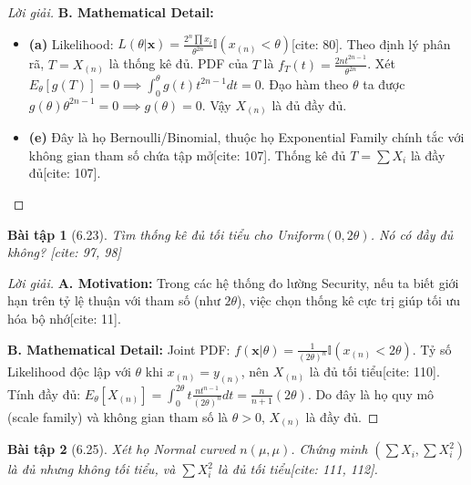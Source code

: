 \documentclass[8pt,a4paper]{article}
\newtheorem{exercise}{Bài tập}
\newenvironment{solution}{\begin{proof}[Lời giải]}{\end{proof}}
\begin{document}
\begin{solution}
\textbf{B. Mathematical Detail:}
\begin{itemize}
    \item \textbf{(a)} Likelihood: $L(\theta|\mathbf{x}) = \frac{2^n \prod x_i}{\theta^{2n}} \mathbb{I}(x_{(n)} < \theta)$[cite: 80]. Theo định lý phân rã, $T = X_{(n)}$ là thống kê đủ. PDF của $T$ là $f_T(t) = \frac{2nt^{2n-1}}{\theta^{2n}}$. Xét $E_\theta[g(T)]=0 \implies \int_0^\theta g(t)t^{2n-1} dt = 0$. Đạo hàm theo $\theta$ ta được $g(\theta)\theta^{2n-1} = 0 \implies g(\theta)=0$. Vậy $X_{(n)}$ là đủ đầy đủ.
    \item \textbf{(e)} Đây là họ Bernoulli/Binomial, thuộc họ Exponential Family chính tắc với không gian tham số chứa tập mở[cite: 107]. Thống kê đủ $T = \sum X_i$ là đầy đủ[cite: 107].
\end{itemize}
\end{solution}

\begin{exercise}[6.23]
Tìm thống kê đủ tối tiểu cho Uniform$(0, 2\theta)$. Nó có đầy đủ không? [cite: 97, 98]
\end{exercise}

\begin{solution}
\textbf{A. Motivation:} Trong các hệ thống đo lường Security, nếu ta biết giới hạn trên tỷ lệ thuận với tham số (như $2\theta$), việc chọn thống kê cực trị giúp tối ưu hóa bộ nhớ[cite: 11].

\textbf{B. Mathematical Detail:}
Joint PDF: $f(\mathbf{x}|\theta) = \frac{1}{(2\theta)^n} \mathbb{I}(x_{(n)} < 2\theta)$. Tỷ số Likelihood độc lập với $\theta$ khi $x_{(n)} = y_{(n)}$, nên $X_{(n)}$ là đủ tối tiểu[cite: 110]. 
Tính đầy đủ: $E_\theta[X_{(n)}] = \int_0^{2\theta} t \frac{nt^{n-1}}{(2\theta)^n} dt = \frac{n}{n+1}(2\theta)$. Do đây là họ quy mô (scale family) và không gian tham số là $\theta > 0$, $X_{(n)}$ là đầy đủ.
\end{solution}

\begin{exercise}[6.25]
Xét họ Normal curved $n(\mu, \mu)$. Chứng minh $(\sum X_i, \sum X_i^2)$ là đủ nhưng không tối tiểu, và $\sum X_i^2$ là đủ tối tiểu[cite: 111, 112].
\end{exercise}
\end{document}
